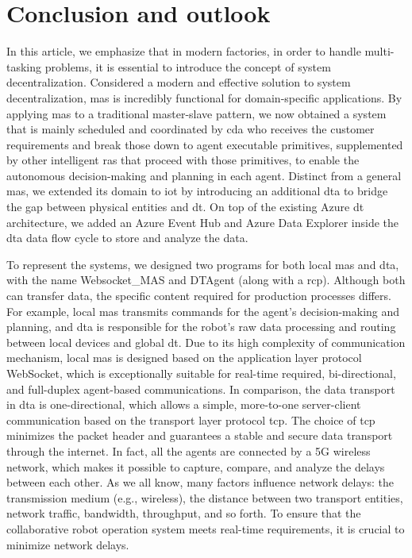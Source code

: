 \chapter{Conclusion and outlook}

In this article, we emphasize that in modern factories, in order to handle 
multi-tasking problems, it is essential to introduce the concept of system 
decentralization. Considered a modern and effective solution to system 
decentralization, \gls{mas} is incredibly functional for domain-specific 
applications. By applying \gls{mas} to a traditional master-slave\cite{egger_deployment-friendly_2020} 
pattern, we now obtained a system that is mainly scheduled and coordinated 
by \gls{cda} who receives the customer requirements and break those down to agent 
executable primitives, supplemented by other intelligent \gls{ras} that proceed 
with those primitives, to enable the 
autonomous decision-making and planning in each agent. Distinct from a 
general \gls{mas}, we extended its domain to \gls{iot} by 
introducing an additional \gls{dta} to bridge the gap between physical 
entities and \gls{dt}. On top of the existing Azure \gls{dt} architecture, we 
added an Azure Event Hub and Azure Data Explorer inside the \gls{dta} data 
flow cycle to store and analyze the data. 


To represent the systems, we designed two programs for both local 
\gls{mas} and \gls{dta}, with the name Websocket\_MAS and DTAgent 
(along with a \gls{rcp}). Although both can transfer data, the 
specific content required for production processes differs. For 
example, local \gls{mas} transmits commands for the agent's decision-making 
and planning, and \gls{dta} is responsible for the robot's raw data processing 
and routing between local devices and global \gls{dt}. Due to its high complexity 
of communication mechanism, local \gls{mas} is designed based on the application 
layer protocol WebSocket, which is exceptionally suitable for real-time required, 
bi-directional, and full-duplex agent-based communications. 
In comparison, the data transport in \gls{dta} is one-directional, which allows 
a simple, more-to-one server-client communication based on the transport layer 
protocol \gls{tcp}. The choice of \gls{tcp} minimizes the packet header and 
guarantees a stable and secure data transport through the internet. In fact, 
all the agents are connected by a 5G wireless network, which makes it possible 
to capture, compare, and analyze the delays between each other. As we all know, 
many factors influence network delays: the transmission medium (e.g., wireless), 
the distance between two transport entities, network traffic, bandwidth, 
throughput, and so forth. To ensure that the collaborative robot operation 
system meets real-time requirements, it is crucial to minimize network delays. 



